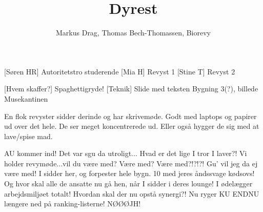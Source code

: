 \documentclass[a4paper,12pt]{article}
\title{Dyrest}
\author{Markus Drag, Thomas Bech-Thomassen, Biorevy}
\begin{document}
\maketitle

\begin{texxers}
\end{texxers}

\begin{roles}
	[Søren HR] Autoritetstro studerende
	[Mia H] Revyst 1
	[Stine T] Revyst 2
\end{roles}


\begin{props}
	[Hvem skaffer?] Spaghettigryde!
	[Teknik] Slide med teksten Bygning 3(?), billede Musekantinen
\end{props}

\begin{sketch}


\scene En flok revyster sidder derinde og har skrivemøde. Godt med laptops og papirer ud over det hele. De ser meget koncentrerede ud. Eller også hygger de sig med at lave/spise mad. 

\scene AU kommer ind!
 Det var sgu da utroligt...
 Hvad er det lige I tror I laver?!
 Vi holder revymøde...vil du være med?
 Være med? Være med?!?!?! Gu' vil jeg da ej være med! I sidder her, og forpester hele bygn. 10 med jeres åndssvage kødsovs! Og hvor skal alle de ansatte nu gå hen, når I sidder i deres lounge! I ødelægger arbejdsmiljøet totalt! Hvordan skal der nu opstå synergi?! Nu ryger KU ENDNU længere ned på ranking-listerne! NØØØJH!




\end{sketch}
\end{document}
